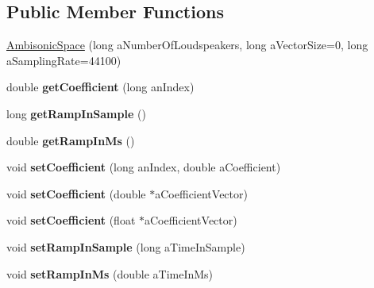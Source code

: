 \subsection*{Public Member Functions}
\begin{DoxyCompactItemize}
\item 
\hyperlink{class_ambisonic_space_ae68da0697f53d7571c60fc42cc2325ac}{Ambisonic\-Space} (long a\-Number\-Of\-Loudspeakers, long a\-Vector\-Size=0, long a\-Sampling\-Rate=44100)
\item 
\hypertarget{class_ambisonic_space_a8ead71c1496a8d6aedfc7d556c893eef}{double {\bfseries get\-Coefficient} (long an\-Index)}\label{class_ambisonic_space_a8ead71c1496a8d6aedfc7d556c893eef}

\item 
\hypertarget{class_ambisonic_space_a40647ad478fc03f52cee8f6c6e53d9e6}{long {\bfseries get\-Ramp\-In\-Sample} ()}\label{class_ambisonic_space_a40647ad478fc03f52cee8f6c6e53d9e6}

\item 
\hypertarget{class_ambisonic_space_af4f37bedbb6d475b43ccc1cb2fc521cc}{double {\bfseries get\-Ramp\-In\-Ms} ()}\label{class_ambisonic_space_af4f37bedbb6d475b43ccc1cb2fc521cc}

\item 
\hypertarget{class_ambisonic_space_a5263705cddcb592609a8d4bd065c51a7}{void {\bfseries set\-Coefficient} (long an\-Index, double a\-Coefficient)}\label{class_ambisonic_space_a5263705cddcb592609a8d4bd065c51a7}

\item 
\hypertarget{class_ambisonic_space_ad10e02e085175c9f4bf93be4a7dc44da}{void {\bfseries set\-Coefficient} (double $\ast$a\-Coefficient\-Vector)}\label{class_ambisonic_space_ad10e02e085175c9f4bf93be4a7dc44da}

\item 
\hypertarget{class_ambisonic_space_acedc50bcebd09b818fb993e7501b9c9c}{void {\bfseries set\-Coefficient} (float $\ast$a\-Coefficient\-Vector)}\label{class_ambisonic_space_acedc50bcebd09b818fb993e7501b9c9c}

\item 
\hypertarget{class_ambisonic_space_af61e5bffdde94728149fed34df27b014}{void {\bfseries set\-Ramp\-In\-Sample} (long a\-Time\-In\-Sample)}\label{class_ambisonic_space_af61e5bffdde94728149fed34df27b014}

\item 
\hypertarget{class_ambisonic_space_a1bb106fbd02420e8aaf94aad137d11ee}{void {\bfseries set\-Ramp\-In\-Ms} (double a\-Time\-In\-Ms)}\label{class_ambisonic_space_a1bb106fbd02420e8aaf94aad137d11ee}


\end{DoxyCompactItemize}
